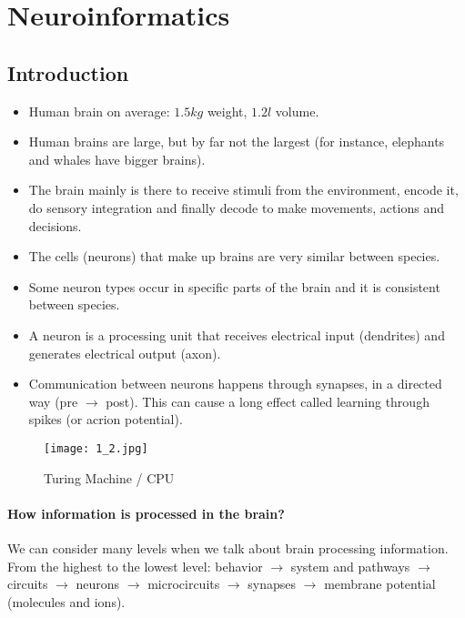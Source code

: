 \documentclass[main]{subfiles}
\begin{document}

\section{Neuroinformatics}

\subsection{Introduction}
\begin{itemize}[noitemsep,nolistsep]
	\item Human brain on average: $1.5 kg$ weight, $1.2 l$ volume.
	\item Human brains are large, but by far not the largest (for instance, elephants and whales have bigger brains).
	\item The brain mainly is there to receive stimuli from the environment, encode it, do sensory integration and finally decode to make movements, actions and decisions.
	\item The cells (neurons) that make up brains are very similar between species.
	\item Some neuron types occur in specific parts of the brain and it is consistent between species.
	\item A neuron is a processing unit that receives electrical input (dendrites) and generates electrical output (axon).
	\item Communication between neurons happens through synapses, in a directed way (pre $\rightarrow$ post). This can cause a long effect called learning through spikes (or acrion potential).

\end{itemize}
\begin{figure}[htbp]
	\centering
	\texttt{[image: 1\_2.jpg]}
 	\caption{Turing Machine / CPU}
\end{figure} 

\paragraph{How information is processed in the brain?}
We can consider many levels when we talk about brain processing information.
From the highest to the lowest level: behavior $\rightarrow$ system and pathways $\rightarrow$ circuits $\rightarrow$ neurons $\rightarrow$ microcircuits $\rightarrow$ synapses $\rightarrow$ membrane potential (molecules and ions). \\
\end{document}
